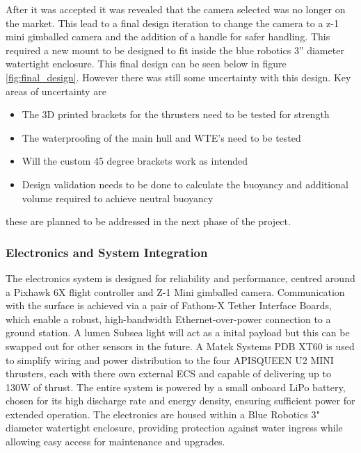 \documentclass[11pt, a4paper]{article}
\begin{document}
After it was accepted it was revealed that the camera selected was no longer on the market. This lead to a final design iteration to change the camera to a z-1 mini gimballed camera and the addition of a handle for safer handling. This required a new mount to be designed to fit inside the blue robotics 3'' diameter watertight enclosure. This final design can be seen below in figure \ref{fig:final_design}. However there was still some uncertainty with this design. Key areas of uncertainty are
\begin{itemize}
    \item The 3D printed brackets for the thrusters need to be tested for strength
    \item The waterproofing of the main hull and WTE's need to be tested
    \item Will the custom 45 degree brackets work as intended
    \item Design validation needs to be done to calculate the buoyancy and additional volume required to achieve neutral buoyancy
\end{itemize}

these are planned to be addressed in the next phase of the project.

\subsubsection{Electronics and System Integration}
The electronics system is designed for reliability and performance, centred around a Pixhawk 6X flight controller and Z-1 Mini gimballed camera. Communication with the surface is achieved via a pair of Fathom-X Tether Interface Boards, which enable a robust, high-bandwidth Ethernet-over-power connection to a ground station. A lumen Subsea light will act as a inital payload but this can be swapped out for other sensors in the future.
A Matek Systems PDB XT60 is used to simplify wiring and power distribution to the four APISQUEEN U2 MINI thrusters, each with there own external ECS and capable of delivering up to 130W of thrust. The entire system is powered by a small onboard LiPo battery, chosen for its high discharge rate and energy density, ensuring sufficient power for extended operation. The electronics are housed within a Blue Robotics 3" diameter watertight enclosure, providing protection against water ingress while allowing easy access for maintenance and upgrades.
\end{document}
